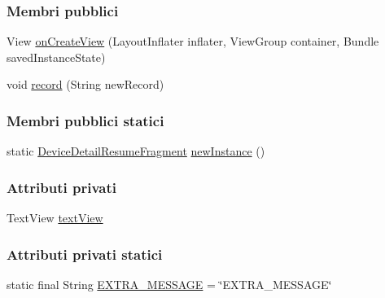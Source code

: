 \subsubsection*{Membri pubblici}
\begin{DoxyCompactItemize}
\item 
View \hyperlink{classit_1_1unibo_1_1torsello_1_1bluetoothpositioning_1_1fragment_1_1DeviceDetailResumeFragment_ac6332cf63f2ea0f1276b031c1b17537f_ac6332cf63f2ea0f1276b031c1b17537f}{on\+Create\+View} (Layout\+Inflater inflater, View\+Group container, Bundle saved\+Instance\+State)
\item 
void \hyperlink{classit_1_1unibo_1_1torsello_1_1bluetoothpositioning_1_1fragment_1_1DeviceDetailResumeFragment_aa4b3952d75b693caa46309f0f2ca05b4_aa4b3952d75b693caa46309f0f2ca05b4}{record} (String new\+Record)
\end{DoxyCompactItemize}
\subsubsection*{Membri pubblici statici}
\begin{DoxyCompactItemize}
\item 
static \hyperlink{classit_1_1unibo_1_1torsello_1_1bluetoothpositioning_1_1fragment_1_1DeviceDetailResumeFragment}{Device\+Detail\+Resume\+Fragment} \hyperlink{classit_1_1unibo_1_1torsello_1_1bluetoothpositioning_1_1fragment_1_1DeviceDetailResumeFragment_aab49893918bdd656328e6ee8021e1c52_aab49893918bdd656328e6ee8021e1c52}{new\+Instance} ()
\end{DoxyCompactItemize}
\subsubsection*{Attributi privati}
\begin{DoxyCompactItemize}
\item 
Text\+View \hyperlink{classit_1_1unibo_1_1torsello_1_1bluetoothpositioning_1_1fragment_1_1DeviceDetailResumeFragment_a0ce36645eb31d9ab981a9dfeef206ada_a0ce36645eb31d9ab981a9dfeef206ada}{text\+View}
\end{DoxyCompactItemize}
\subsubsection*{Attributi privati statici}
\begin{DoxyCompactItemize}
\item 
static final String \hyperlink{classit_1_1unibo_1_1torsello_1_1bluetoothpositioning_1_1fragment_1_1DeviceDetailResumeFragment_a26b6bb100efe8bbb74e10fbd8deca47f_a26b6bb100efe8bbb74e10fbd8deca47f}{E\+X\+T\+R\+A\+\_\+\+M\+E\+S\+S\+A\+GE} = \char`\"{}E\+X\+T\+R\+A\+\_\+\+M\+E\+S\+S\+A\+GE\char`\"{}
\end{DoxyCompactItemize}


